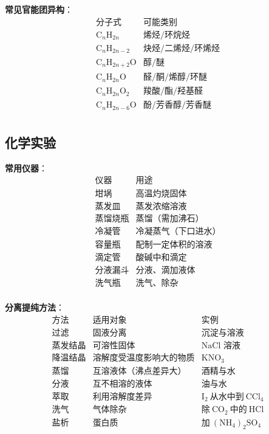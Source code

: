 \textbf{常见官能团异构}：
\[
\begin{array}{c|c}
\text{分子式} & \text{可能类别} \\ \hline
\text{C}_n\text{H}_{2n} & \text{烯烃/环烷烃} \\
\text{C}_n\text{H}_{2n-2} & \text{炔烃/二烯烃/环烯烃} \\
\text{C}_n\text{H}_{2n+2}\text{O} & \text{醇/醚} \\
\text{C}_n\text{H}_{2n}\text{O} & \text{醛/酮/烯醇/环醚} \\
\text{C}_n\text{H}_{2n}\text{O}_2 & \text{羧酸/酯/羟基醛} \\
\text{C}_n\text{H}_{2n-6}\text{O} & \text{酚/芳香醇/芳香醚} \\
\end{array}
\]

\subsection{化学实验}

\textbf{常用仪器}：
\[
\begin{array}{c|c}
\text{仪器} & \text{用途} \\ \hline
\text{坩埚} & \text{高温灼烧固体} \\
\text{蒸发皿} & \text{蒸发浓缩溶液} \\
\text{蒸馏烧瓶} & \text{蒸馏（需加沸石）} \\
\text{冷凝管} & \text{冷凝蒸气（下口进水）} \\
\text{容量瓶} & \text{配制一定体积的溶液} \\
\text{滴定管} & \text{酸碱中和滴定} \\
\text{分液漏斗} & \text{分液、滴加液体} \\
\text{洗气瓶} & \text{洗气、除杂} \\
\end{array}
\]

\textbf{分离提纯方法}：
\[
\begin{array}{c|c|c}
\text{方法} & \text{适用对象} & \text{实例} \\ \hline
\text{过滤} & \text{固液分离} & \text{沉淀与溶液} \\
\text{蒸发结晶} & \text{可溶性固体} & \text{NaCl 溶液} \\
\text{降温结晶} & \text{溶解度受温度影响大的物质} & \text{KNO}_3 \\
\text{蒸馏} & \text{互溶液体（沸点差异大）} & \text{酒精与水} \\
\text{分液} & \text{互不相溶的液体} & \text{油与水} \\
\text{萃取} & \text{利用溶解度差异} & \text{I}_2\ \text{从水中到}\ \text{CCl}_4 \\
\text{洗气} & \text{气体除杂} & \text{除}\ \text{CO}_2\ \text{中的}\ \text{HCl} \\
\text{盐析} & \text{蛋白质} & \text{加}\ (\text{NH}_4)_2\text{SO}_4 \\
\end{array}
\]

